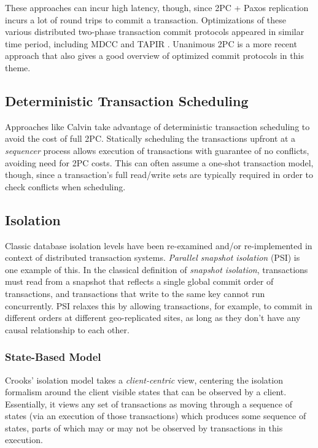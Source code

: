 \documentclass[10pt,a4paper]{article}
\begin{document}
These approaches can incur high latency, though, since 2PC + Paxos replication incurs a lot of round trips to commit a transaction. Optimizations of these various distributed two-phase transaction commit protocols appeared in similar time period, including MDCC \cite{2013mdcc} and TAPIR \cite{2015tapir}. Unanimous 2PC \cite{2024unanimous2pc} is a more recent approach that also gives a good overview of optimized commit protocols in this theme. 

\subsection{Deterministic Transaction Scheduling}

Approaches like Calvin \cite{2012calvin} take advantage of deterministic transaction scheduling to avoid the cost of full 2PC. Statically scheduling the transactions upfront at a \textit{sequencer} process allows execution of transactions with guarantee of no conflicts, avoiding need for 2PC costs. This can often assume a one-shot transaction model, though, since a transaction's full read/write sets are typically required in order to check conflicts when scheduling.

\subsection{Isolation}

Classic database isolation levels have been re-examined and/or re-implemented in context of distributed transaction systems. \textit{Parallel snapshot isolation} (PSI) \cite{2011walter} is one example of this. In the classical definition of \textit{snapshot isolation}, transactions must read from a snapshot that reflects a single global commit order of transactions, and transactions that write to the same key cannot run concurrently. PSI relaxes this by allowing transactions, for example, to commit in different orders at different geo-replicated sites, as long as they don't have any causal relationship to each other.

\subsubsection{State-Based Model}

Crooks' \cite{2017seeingcrooks} isolation model takes a \textit{client-centric} view, centering the isolation formalism around the client visible states that can be observed by a client. Essentially, it views any set of transactions as moving through a sequence of states (via an execution of those transactions) which produces some sequence of states, parts of which may or may not be observed by transactions in this execution.
\end{document}
